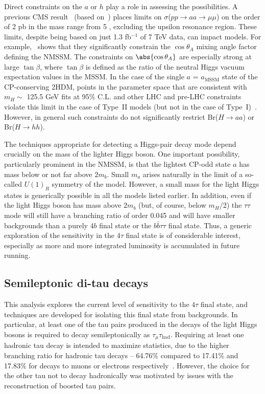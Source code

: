 Direct constraints on the $a$ or $h$ play a role in assessing the possibilities. A previous CMS result~\cite{Chatrchyan:2012am} (based on~\cite{Dermisek:2009fd}) places limits on $\sigma$($pp$$\rightarrow$$aa$$\rightarrow$$\mu\mu$) on the order of 2 pb in the mass range from 5 \GeV, excluding the upsilon resonance region.  These limits, despite being based on just 1.3 fb$^{-1}$ of 7 TeV data, can impact models. For example,~\cite{Chatrchyan:2012am} shows that they significantly constrain the $\cos\theta_A$ mixing angle factor defining the NMSSM.  The constraints on $\abs{\cos\theta_A}$ are especially strong at large $\tan\beta$, where $\tan\beta$ is defined as the ratio of the neutral Higgs vacuum expectation values in the MSSM. In the case of the single $a$ = $a_{\text{MSSM}}$ state of the CP-conserving 2HDM, points in the parameter space that are consistent with $m_H \sim$ 125.5 GeV fits at 95\% C.L. and other LHC and pre-LHC constraints violate this limit in the case of Type~II models (but not in the case of Type~I)~\cite{Dumont:2014wha}.  However, in general such constraints do not significantly restrict Br($H$$\rightarrow$$aa$) or Br($H$$\rightarrow$$hh$).  

The techniques appropriate for detecting a Higgs-pair decay mode depend crucially on the mass of the lighter Higgs boson. One important possibility, particularly prominent in the NMSSM, is that the lightest CP-odd state $a$ has mass below or not far above $2m_b$. Small $m_a$ arises naturally in the limit of a so-called $U(1)_R$ symmetry of the model. However, a small mass for the light Higgs states is generically possible in all the models listed earlier. In addition, even if the light Higgs boson has mass above $2m_b$ (but, of course, below $m_H$/2) the $\tau\tau$ mode will still have a branching ratio of order 0.045 and will have smaller backgrounds than a purely 4$b$ final state or the $b\bar{b}\tau\tau$ final state. Thus, a generic exploration of the sensitivity in the $4\tau$ final state is of considerable interest, especially as more and more integrated luminosity is accumulated in future running.

\subsection{Semileptonic di-tau decays\label{sec:semileptonic}}
This analysis explores the current level of sensitivity to the $4\tau$ final state, and techniques are developed for isolating this final state from backgrounds. In particular, at least one of the tau pairs produced in the decays of the light Higgs bosons is required to decay semileptonically as $\tau_{\mu}\tau_{\text{had}}$. Requiring at least one hadronic tau decay is intended to maximize statistics, due to the higher branching ratio for hadronic tau decays -- 64.76\% compared to 17.41\% and 17.83\% for decays to muons or electrons respectively~\cite{Agashe:2014kda}. However, the choice for the other tau not to decay hadronically was motivated by issues with the reconstruction of boosted tau pairs.

